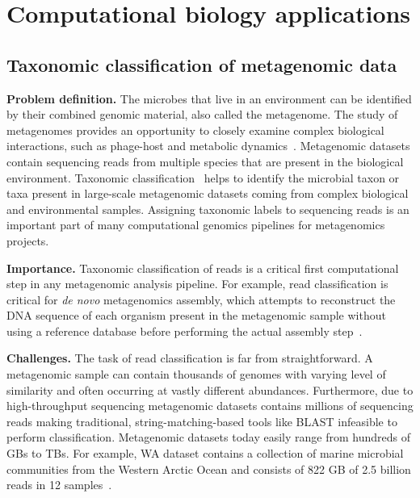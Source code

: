 
\section{Computational biology applications}


\subsection{Taxonomic classification of metagenomic data}

{\bf Problem definition.}
The microbes that live in an environment can be identified by their combined genomic material, also called the metagenome.
The study of metagenomes provides an opportunity to closely examine complex biological interactions, such as phage-host and metabolic dynamics~\cite{national2007new}.
Metagenomic datasets contain sequencing reads from multiple species that are present in the biological environment.
%
Taxonomic classification~\cite{wood2014kraken} helps to identify the microbial taxon or taxa present in large-scale  metagenomic datasets coming from complex biological and environmental samples. Assigning taxonomic labels to sequencing reads is an important part of many computational genomics pipelines for metagenomics projects.

\noindent
{\bf Importance.}
Taxonomic classification of reads is a critical first computational step in any metagenomic analysis pipeline.
For example, read classification is critical for \emph{de novo} metagenomics assembly, which attempts to reconstruct the DNA sequence of each organism present in the metagenomic sample without using a reference database before performing the actual assembly step~\cite{venter2004environmental,brady2009phymm,brady2011phymmbl,rosen2008metagenome,segata2012metagenomic}.

\noindent
{\bf Challenges.}
The task of read classification is far from straightforward. 
A metagenomic sample can contain thousands of genomes with varying level of similarity and often occurring at vastly different abundances. Furthermore, due to high-throughput sequencing metagenomic datasets contains millions of sequencing reads making traditional, string-matching-based tools like BLAST infeasible to perform classification. Metagenomic datasets today easily range from hundreds of GBs to TBs. For example, WA dataset contains a collection of marine microbial communities from the Western Arctic Ocean and consists of 822 GB of 2.5 billion reads in 12 samples~\cite{hofmeyr2020terabase}.

